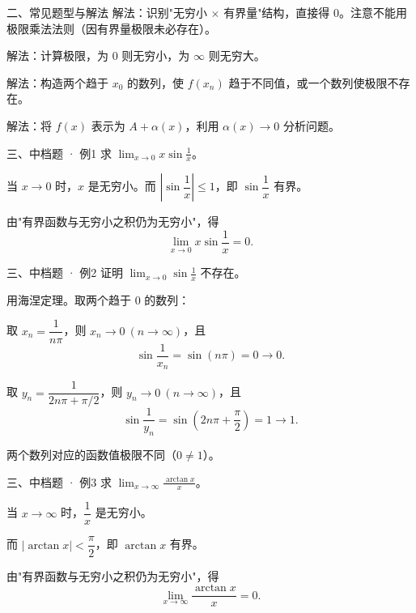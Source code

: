 \documentclass[aspectratio=169,11pt]{beamer}
\begin{document}
\begin{frame}{二、常见题型与解法}
解法：识别"无穷小 $\times$ 有界量"结构，直接得 $0$。注意不能用极限乘法法则（因有界量极限未必存在）。

解法：计算极限，为 $0$ 则无穷小，为 $\infty$ 则无穷大。

解法：构造两个趋于 $x_0$ 的数列，使 $f(x_n)$ 趋于不同值，或一个数列使极限不存在。

解法：将 $f(x)$ 表示为 $A+\alpha(x)$，利用 $\alpha(x)\to 0$ 分析问题。
\end{frame}

\begin{frame}{三、中档题 · 例1}
 求 $\displaystyle\lim_{x\to 0}x\sin\frac1x$。

 当 $x\to 0$ 时，$x$ 是无穷小。而 $\left|\sin\dfrac1x\right|\le 1$，即 $\sin\dfrac1x$ 有界。

由"有界函数与无穷小之积仍为无穷小"，得
\[
\lim_{x\to 0}x\sin\frac1x=0.
\]


\end{frame}

\begin{frame}{三、中档题 · 例2}
 证明 $\displaystyle\lim_{x\to 0}\sin\frac1x$ 不存在。

 用海涅定理。取两个趋于 $0$ 的数列：

取 $x_n=\dfrac1{n\pi}$，则 $x_n\to 0\ (n\to\infty)$，且
\[
\sin\frac1{x_n}=\sin(n\pi)=0\to 0.
\]

取 $y_n=\dfrac1{2n\pi+\pi/2}$，则 $y_n\to 0\ (n\to\infty)$，且
\[
\sin\frac1{y_n}=\sin\left(2n\pi+\frac\pi2\right)=1\to 1.
\]

两个数列对应的函数值极限不同（$0\ne 1$）。

\end{frame}

\begin{frame}{三、中档题 · 例3}
 求 $\displaystyle\lim_{x\to\infty}\frac{\arctan x}{x}$。

 当 $x\to\infty$ 时，$\dfrac1x$ 是无穷小。

而 $|\arctan x|<\dfrac{\pi}{2}$，即 $\arctan x$ 有界。

由"有界函数与无穷小之积仍为无穷小"，得
\[
\lim_{x\to\infty}\frac{\arctan x}{x}=0.
\]

\end{frame}
\end{document}
